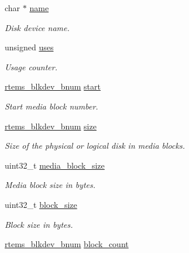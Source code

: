 \begin{DoxyCompactItemize}
char $\ast$ \mbox{\hyperlink{structrtems__disk__device_ad4ab4464c9a9a32c253655a379fdfad2}{name}}
\begin{DoxyCompactList}\small\item\em Disk device name. \end{DoxyCompactList}\item 
unsigned \mbox{\hyperlink{structrtems__disk__device_a5a8a2b41e014367de746f134f2c9ade5}{uses}}
\begin{DoxyCompactList}\small\item\em Usage counter. \end{DoxyCompactList}\item 
\mbox{\hyperlink{group__rtems__disk_ga5fbcfd40b657bff6c54d9e393fab3274}{rtems\+\_\+blkdev\+\_\+bnum}} \mbox{\hyperlink{structrtems__disk__device_a6fc636a2742b7d9407e559cdd3899e6e}{start}}
\begin{DoxyCompactList}\small\item\em Start media block number. \end{DoxyCompactList}\item 
\mbox{\label{structrtems__disk__device_a8db6cbb48e540656d5d4d4903032743c}} 
\mbox{\hyperlink{group__rtems__disk_ga5fbcfd40b657bff6c54d9e393fab3274}{rtems\+\_\+blkdev\+\_\+bnum}} \mbox{\hyperlink{structrtems__disk__device_a8db6cbb48e540656d5d4d4903032743c}{size}}
\begin{DoxyCompactList}\small\item\em Size of the physical or logical disk in media blocks. \end{DoxyCompactList}\item 
uint32\+\_\+t \mbox{\hyperlink{structrtems__disk__device_a1f446627e8cc11b5ce75d90aa8ad6c92}{media\+\_\+block\+\_\+size}}
\begin{DoxyCompactList}\small\item\em Media block size in bytes. \end{DoxyCompactList}\item 
uint32\+\_\+t \mbox{\hyperlink{structrtems__disk__device_abea6f3f85ded92ea807c60eb0a1de472}{block\+\_\+size}}
\begin{DoxyCompactList}\small\item\em Block size in bytes. \end{DoxyCompactList}\item 
\mbox{\hyperlink{group__rtems__disk_ga5fbcfd40b657bff6c54d9e393fab3274}{rtems\+\_\+blkdev\+\_\+bnum}} \mbox{\hyperlink{structrtems__disk__device_ae8d3d63a4eaf18abf1f0f5e22487bedf}{block\+\_\+count}}

\end{DoxyCompactItemize}
